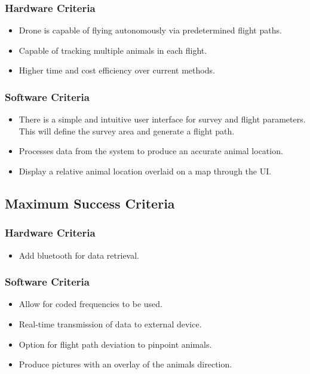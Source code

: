 \documentclass[onecolumn, draftclsnofoot,10pt, compsoc]{IEEEtran}
\begin{document}
        \subsubsection{Hardware Criteria}
            \begin{itemize}
                \item Drone is capable of flying    autonomously via predetermined flight paths.
                \item Capable of tracking multiple animals in each flight.
                \item Higher time and cost efficiency over current methods.
            \end{itemize}
        \subsubsection{Software Criteria}
            \begin{itemize}
                \item There is a simple and intuitive user interface for survey and flight parameters. This will define the survey area and generate a flight path.
                \item Processes data from the system to produce an accurate animal location.
                \item Display a relative animal location overlaid on a map through the UI.

            \end{itemize}
    \subsection{Maximum Success Criteria}
        \subsubsection{Hardware Criteria}
            \begin{itemize}
                \item Add bluetooth for data retrieval.
            \end{itemize}
        \subsubsection{Software Criteria}
            \begin{itemize}
                \item Allow for coded frequencies to be used.
                \item Real-time transmission of data to external device.
                \item Option for flight path deviation to pinpoint animals.
                \item Produce pictures with an overlay of the animals direction.
            \end{itemize}
\end{document}

